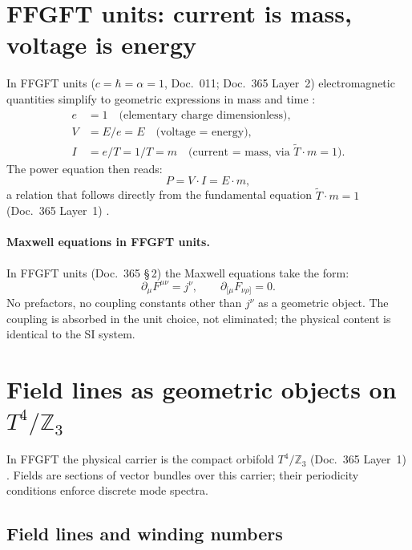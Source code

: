 \section{FFGFT units: current is mass, voltage is energy}

In FFGFT units ($c = \hbar = \alpha = 1$, Doc.~011; Doc.~365 Layer~2)
electromagnetic quantities simplify to geometric expressions in mass and
time \KM:
\begin{align*}
  e &= 1 \quad \text{(elementary charge dimensionless)},\\
  V &= E/e = E \quad \text{(voltage = energy)},\\
  I &= e/T = 1/T = m \quad \text{(current = mass, via }\tilde{T}\cdot m=1\text{)}.
\end{align*}
The power equation then reads:
\[
  P = V \cdot I = E \cdot m,
\]
a relation that follows directly from the fundamental equation
$\tilde{T}\cdot m=1$ (Doc.~365 Layer~1) \KM.

\paragraph{Maxwell equations in FFGFT units.}
In FFGFT units (Doc.~365 \S\,2) the Maxwell equations take the form:
\[
  \partial_\mu F^{\mu\nu} = j^\nu, \qquad \partial_{[\mu}F_{\nu\rho]}=0.
\]
No prefactors, no coupling constants other than $j^\nu$ as a geometric
object. The coupling is absorbed in the unit choice, not eliminated; the
physical content is identical to the SI system.

\section{Field lines as geometric objects on $T^4/\mathbb{Z}_3$}

In FFGFT the physical carrier is the compact orbifold $T^4/\mathbb{Z}_3$
(Doc.~365 Layer~1) \SetzM. Fields are sections of vector bundles over this
carrier; their periodicity conditions enforce discrete mode spectra.

\subsection*{Field lines and winding numbers}

